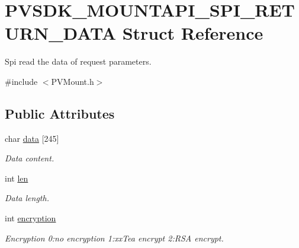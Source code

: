 \hypertarget{struct_p_v_s_d_k___m_o_u_n_t_a_p_i___s_p_i___r_e_t_u_r_n___d_a_t_a}{}\section{P\+V\+S\+D\+K\+\_\+\+M\+O\+U\+N\+T\+A\+P\+I\+\_\+\+S\+P\+I\+\_\+\+R\+E\+T\+U\+R\+N\+\_\+\+D\+A\+TA Struct Reference}
\label{struct_p_v_s_d_k___m_o_u_n_t_a_p_i___s_p_i___r_e_t_u_r_n___d_a_t_a}


Spi read the data of request parameters.  




{\ttfamily \#include $<$P\+V\+Mount.\+h$>$}

\subsection*{Public Attributes}
\begin{DoxyCompactItemize}
\item 
\mbox{\label{struct_p_v_s_d_k___m_o_u_n_t_a_p_i___s_p_i___r_e_t_u_r_n___d_a_t_a_ab10da45b28cd24e4c5362469bb0eea6c}} 
char \hyperlink{struct_p_v_s_d_k___m_o_u_n_t_a_p_i___s_p_i___r_e_t_u_r_n___d_a_t_a_ab10da45b28cd24e4c5362469bb0eea6c}{data} \mbox{[}245\mbox{]}
\begin{DoxyCompactList}\small\item\em Data content. \end{DoxyCompactList}\item 
\mbox{\label{struct_p_v_s_d_k___m_o_u_n_t_a_p_i___s_p_i___r_e_t_u_r_n___d_a_t_a_aba2c412986cf5b296645e9deea93ce16}} 
int \hyperlink{struct_p_v_s_d_k___m_o_u_n_t_a_p_i___s_p_i___r_e_t_u_r_n___d_a_t_a_aba2c412986cf5b296645e9deea93ce16}{len}
\begin{DoxyCompactList}\small\item\em Data length. \end{DoxyCompactList}\item 
\mbox{\label{struct_p_v_s_d_k___m_o_u_n_t_a_p_i___s_p_i___r_e_t_u_r_n___d_a_t_a_abdea50e93fbcd3a53e1a1836e16f24b8}} 
int \hyperlink{struct_p_v_s_d_k___m_o_u_n_t_a_p_i___s_p_i___r_e_t_u_r_n___d_a_t_a_abdea50e93fbcd3a53e1a1836e16f24b8}{encryption}
\begin{DoxyCompactList}\small\item\em Encryption 0\+:no encryption 1\+:xx\+Tea encrypt 2\+:R\+SA encrypt. \end{DoxyCompactList}\end{DoxyCompactItemize}


